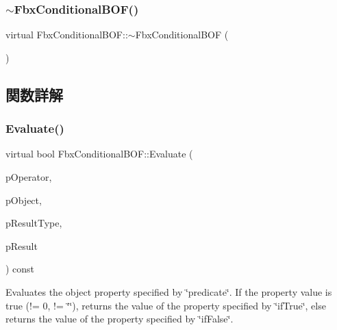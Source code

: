 \subsubsection{\texorpdfstring{$\sim$\+Fbx\+Conditional\+B\+O\+F()}{~FbxConditionalBOF()}}
{\footnotesize\ttfamily virtual Fbx\+Conditional\+B\+O\+F\+::$\sim$\+Fbx\+Conditional\+B\+OF (\begin{DoxyParamCaption}{ }\end{DoxyParamCaption})\hspace{0.3cm}{\ttfamily [virtual]}}



\subsection{関数詳解}
\mbox{\label{class_fbx_conditional_b_o_f_ac01ad643a1505219964c8b379385e931}} 
\subsubsection{\texorpdfstring{Evaluate()}{Evaluate()}}
{\footnotesize\ttfamily virtual bool Fbx\+Conditional\+B\+O\+F\+::\+Evaluate (\begin{DoxyParamCaption}\item[{const \hyperlink{class_fbx_binding_operator}{Fbx\+Binding\+Operator} $\ast$}]{p\+Operator,  }\item[{const \hyperlink{class_fbx_object}{Fbx\+Object} $\ast$}]{p\+Object,  }\item[{\hyperlink{fbxpropertytypes_8h_a73913a5ddfb20e57c6f25e9e6784bd92}{E\+Fbx\+Type} $\ast$}]{p\+Result\+Type,  }\item[{void $\ast$$\ast$}]{p\+Result }\end{DoxyParamCaption}) const\hspace{0.3cm}{\ttfamily [virtual]}}

Evaluates the object property specified by \char`\"{}predicate\char`\"{}. If the property value is true (!= 0, != \char`\"{}\char`\"{}), returns the value of the property specified by \char`\"{}if\+True\char`\"{}, else returns the value of the property specified by \char`\"{}if\+False\char`\"{}.

